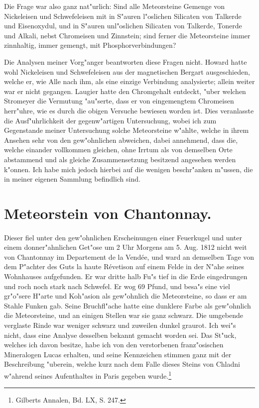 \documentclass[a4paper, 11pt, oneside]{article}
\begin{document}
Die Frage war also ganz nat"urlich: Sind alle Meteorsteine Gemenge von Nickeleisen und Schwefeleisen mit in S"auren l"oslichen Silicaten von Talkerde und Eisenoxydul, und in S"auren unl"oslichen Silicaten von Talkerde, Tonerde und Alkali, nebst Chromeisen und Zinnstein; sind ferner die Meteorsteine immer zinnhaltig, immer gemengt, mit Phosphorverbindungen?

Die Analysen meiner Vorg"anger beantworten diese Fragen nicht. Howard hatte wohl Nickeleisen und Schwefeleisen aus der magnetischen Bergart ausgeschieden, welche er, wie Alle nach ihm, als eine einzige Verbindung analysierte; allein weiter war er nicht gegangen. Laugier hatte den Chromgehalt entdeckt, "uber welchen Stromeyer die Vermutung "au"serte, dass er von eingemengtem Chromeisen herr"uhre, wie es durch die obigen Versuche bewiesen worden ist. Dies veranlasste die Ausf"uhrlichkeit der gegenw"artigen Untersuchung, wobei ich zum Gegenstande meiner Untersuchung solche Meteorsteine w"ahlte, welche in ihrem Ansehen sehr von den gew"ohnlichen abweichen, dabei annehmend, dass die, welche einander vollkommen gleichen, ohne Irrtum als von demselben Orte abstammend und als gleiche Zusammensetzung besitzend angesehen werden k"onnen. Ich habe mich jedoch hierbei auf die wenigen beschr"anken m"ussen, die in meiner eigenen Sammlung befindlich sind.

\section{Meteorstein von Chantonnay.}
\paragraph{}
Dieser fiel unter den gew"ohnlichen Erscheinungen einer Feuerkugel und unter einem donner"ahnlichen Get"ose um 2 Uhr Morgens am 5. Aug. 1812 nicht weit von Chantonnay im Departement de la Vendée, und ward an demselben Tage von dem P"achter des Guts la haute Révetison auf einem Felde in der N"ahe seines Wohnhauses aufgefunden. Er war dritte halb Fu"s tief in die Erde eingedrungen und roch noch stark nach Schwefel. Er wog 69 Pfund, und besa"s eine viel gr"o"sere H"arte und Koh"asion als gew"ohnlich die Meteorsteine, so dass er am Stahle Funken gab. Seine Bruchfl"ache hatte eine dunklere Farbe als gew"ohnlich die Meteorsteine, und an einigen Stellen war sie ganz schwarz. Die umgebende verglaste Rinde war weniger schwarz und zuweilen dunkel graurot. Ich wei"s nicht, dass eine Analyse desselben bekannt gemacht worden sei. Das St"uck, welches ich davon besitze, habe ich von den verstorbenen franz"osischen Mineralogen Lucas erhalten, und seine Kennzeichen stimmen ganz mit der Beschreibung "uberein, welche kurz nach dem Falle dieses Steins von Chladni w"ahrend seines Aufenthaltes in Paris gegeben wurde.\footnote{Gilberts Annalen, Bd. LX, S. 247.}
\end{document}
